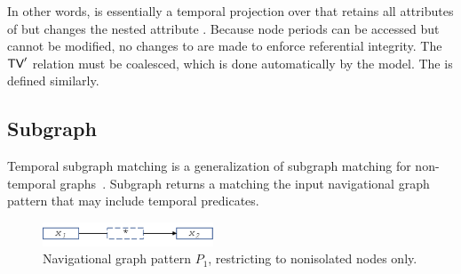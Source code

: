 In other words,  is essentially a temporal
projection over \tv that retains all attributes of \tv but changes the
nested attribute .  Because node periods can be accessed but
cannot be modified, no changes to \te are made to enforce referential
integrity.  The $\textsf{TV}'$ relation must be coalesced, which is done
automatically by the model.  The  is defined
similarly.

\subsection{Subgraph}

Temporal subgraph matching is a generalization of
subgraph matching for non-temporal graphs~\cite{Wood2012}.  Subgraph
returns a \tg matching the input navigational graph pattern that may
include temporal predicates.

\begin{figure}
\centering
\includegraphics[width=2in]{figs/nonisolated.pdf}
\vspace{-0.2cm}
\caption{Navigational graph pattern $P_1$, restricting to nonisolated nodes only.}
\vspace{-0.2cm}
\label{fig:nonisolated}
\end{figure}

